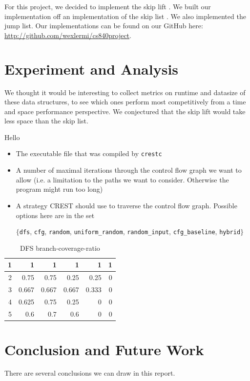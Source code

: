 \documentclass[oribibl]{llncs}
\begin{document}
For this project, we decided to implement the skip lift \cite{skip_lift}. We built our implementation off an implementation of the skip list \cite{skip_list_imp}. We also implemented the jump list\cite{jump_list}.  Our implementations can be found on our GitHub here: \url{http://github.com/wexlermi/cs840project}.

 \section{Experiment and Analysis}
\label{sctn:experiment}

We thought it would be interesting to collect metrics on runtime and datasize of these data structures, to see which ones perform most competitively from a time and space performance perspective. We conjectured that the skip lift would take less space than the skip list.


\begin{remark}
Hello
\end{remark}

\begin{itemize}
  \item The executable file that was compiled by \texttt{crestc}
  \item A number of maximal iterations through the control flow graph
    we want to allow (i.e. a limitation to the paths we
    want to consider. Otherwise the program might run too long)
  \item A strategy \textsc{CREST} should use to traverse the control
    flow graph. Possible options here are in the set
\begin{center}
$\{$\texttt{dfs}, \texttt{cfg}, \texttt{random},
    \texttt{uniform\_random}, \texttt{random\_input}, 
    \texttt{cfg\_baseline}, \texttt{hybrid}$\}$
\end{center}
\end{itemize}


\begin{table}[htbp]
\caption{DFS branch-coverage-ratio}
\begin{center}
\begin{tabular}{|r|r|r|r|r|r|}
\hline
1 & 1 & 1 & 1 & 1 & 1 \\ \hline
2 & 0.75 & 0.75 & 0.25 & 0.25 & 0 \\ \hline
3 & 0.667 & 0.667 & 0.667 & 0.333 & 0 \\ \hline
4 & 0.625 & 0.75 & 0.25 & 0 & 0 \\ \hline
5 & 0.6 & 0.7 & 0.6 & 0 & 0 \\ \hline
\end{tabular}
\end{center}
\label{DFS timings (in seconds)}
\end{table}

\section{Conclusion and Future Work}
\label{sctn:Conclusion}

There are several conclusions we can draw in this report.




\end{document}
